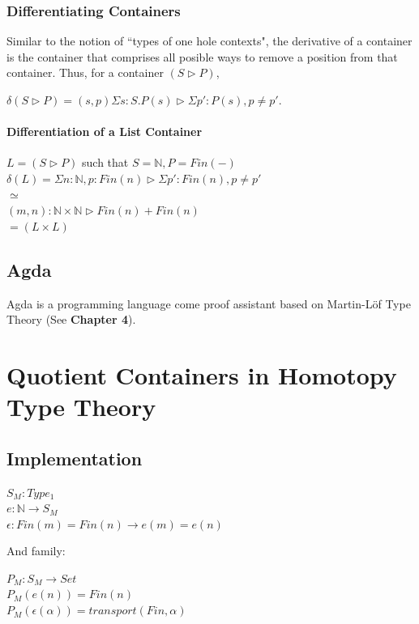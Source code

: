 \documentclass[12pt]{report}
\begin{document}
\section{Differentiating Containers}
Similar to the notion of ``types of one hole contexts", the derivative of a container is the container that comprises all posible ways to remove a position from that container.
\newpage
Thus, for a container $(S \rhd P)$,
\begin{center}
$\delta (S \rhd P) = (s,p) \Sigma s : S . P(s) \rhd \Sigma p':P(s),p \neq p'$.
\end{center}



\subsection{Differentiation of a List Container}
\begin{center}
$L = (S \rhd P)$ such that $S = \mathbb{N}, P = Fin(-)$\\
$\delta(L) = \Sigma n : \mathbb{N}, p: Fin(n) \rhd \Sigma p' : Fin(n), p \neq p'$\\
$\simeq $\\
$(m,n): \mathbb{N} \times \mathbb{N} \rhd Fin(n) + Fin(n)$\\
$= (L \times L)$\\
\end{center} 


\chapter{Agda}
Agda is a programming language come proof assistant based on Martin-L\"of Type Theory (See \textbf{Chapter 4}).







\part{Quotient Containers in Homotopy Type Theory}
\chapter{Implementation}
\begin{center}
$S_M : Type_1$\\
$e : \mathbb{N} \to S_M$\\
$\epsilon : Fin(m) = Fin(n) \to e(m) = e(n) $\\
\end{center}
And family:
\begin{center}
$P_M : S_M \to Set$\\
$P_M(e(n)) = Fin(n)$\\
$P_M(\epsilon(\alpha)) = transport(Fin, \alpha)$\\

\end{center}
\end{document}
